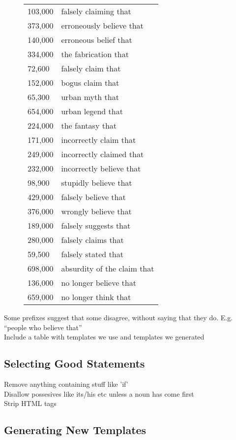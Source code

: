 \documentclass{www2010-submission}
\newcommand{\x}[1]{{\color{blue} #1}\\}
\begin{document}
\begin{figure}[tb]
\begin{tabular}{|ll|}
    103,000 & falsely claiming that \\
    373,000 & erroneously believe that \\
    140,000 & erroneous belief that \\
    334,000 & the fabrication that \\
    72,600 & falsely claim that \\
    152,000 & bogus claim that \\
    65,300 & urban myth that \\
    654,000 & urban legend that \\
    224,000 & the fantasy that \\
    171,000 & incorrectly claim that \\
    249,000 & incorrectly claimed that \\
    232,000 & incorrectly believe that \\
    98,900 & stupidly believe that \\
    429,000 & falsely believe that \\
    376,000 & wrongly believe that \\
    189,000 & falsely suggests that \\
    280,000 & falsely claims that \\
    59,500 & falsely stated that \\
    698,000 & absurdity of the claim that \\
    136,000 & no longer believe that \\
    659,000 & no longer think that \\
    \hline
  \end{tabular}
 
\end{figure}

\x{Some prefixes suggest that some disagree, without saying that they do. E.g. ``people who believe that''}

\x{Include a table with templates we use and templates we generated}



\subsection{Selecting Good Statements}

\x{Remove anything containing stuff like 'if'}
\x{Disallow possesives like its/his etc unless a noun has come first}
\x{Strip HTML tags}

\subsection{Generating New Templates}
\end{document}
